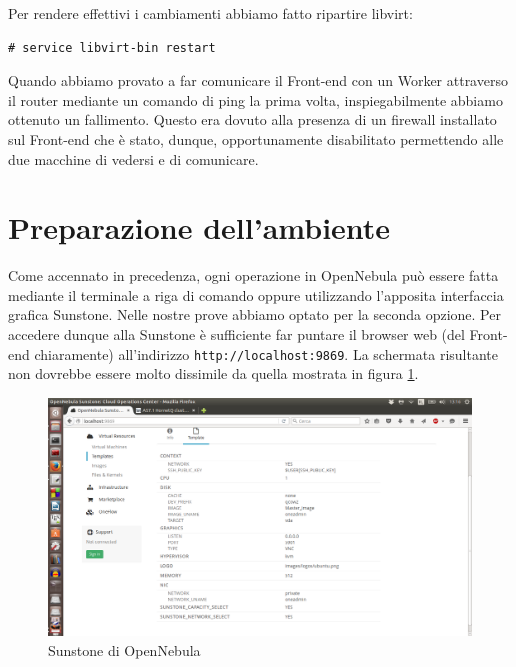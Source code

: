 \documentclass[twoside]{article}
\begin{document}
Per rendere effettivi i cambiamenti abbiamo fatto ripartire libvirt:
\begin{lstlisting}[frame=trBL]
# service libvirt-bin restart
\end{lstlisting}

Quando abbiamo provato a far comunicare il Front-end con un Worker attraverso il router
mediante un comando di ping la prima volta, inspiegabilmente abbiamo ottenuto un fallimento. Questo
era dovuto alla presenza di un firewall installato sul Front-end che è stato, dunque, opportunamente
disabilitato permettendo alle due macchine di vedersi e di comunicare.

\section{Preparazione dell'ambiente}
Come accennato in precedenza, ogni operazione in OpenNebula può essere fatta mediante
il terminale a riga di comando oppure utilizzando l'apposita interfaccia grafica Sunstone. Nelle nostre
prove abbiamo optato per la seconda opzione. Per accedere dunque alla Sunstone è sufficiente far puntare il
browser web (del Front-end chiaramente) all'indirizzo \texttt{http://localhost:9869}. La schermata
risultante non dovrebbe essere molto dissimile da quella mostrata in figura \ref{fig:3}.

\begin{figure}[!bp]
\centering
\includegraphics[width=13cm]{immagine3.png}
\caption{Sunstone di OpenNebula}\label{fig:3}
\end{figure}
\end{document}
